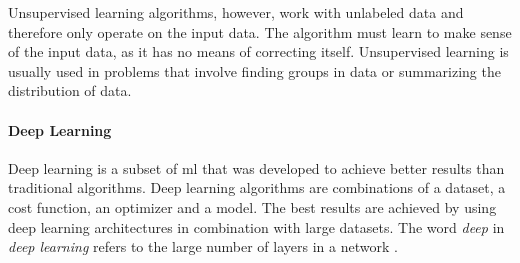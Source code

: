 Unsupervised learning algorithms, however, work with unlabeled data and therefore only operate on the input data.
The algorithm must learn to make sense of the input data, as it has no means of correcting itself.
Unsupervised learning is usually used in problems that involve finding groups in data or summarizing the distribution of data.

\paragraph{Deep Learning}
Deep learning is a subset of \acrlong{ml} that was developed to achieve better results than traditional algorithms.
Deep learning algorithms are combinations of a dataset, a cost function, an optimizer and a model.
The best results are achieved by using deep learning architectures in combination with large datasets.
The word \textit{deep} in \textit{deep learning} refers to the large number of layers in a network \cite[p.~151--152]{deeplearningbook}.









